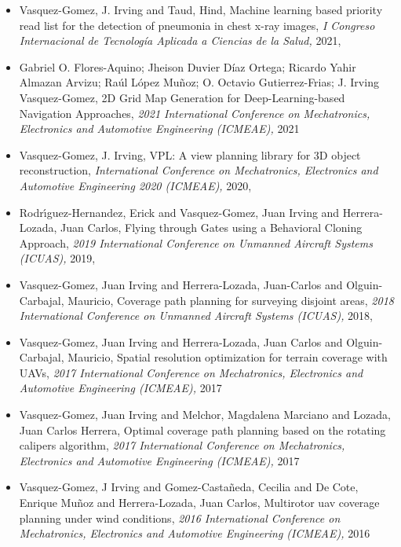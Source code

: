 \begin{itemize} 
\item Vasquez-Gomez, J. Irving and Taud, Hind, Machine learning based priority read list for the detection of pneumonia in chest x-ray images, \textit{ I Congreso Internacional de Tecnología Aplicada a Ciencias de la Salud,} 2021, \href{} {\faFilePdfO} 
\item Gabriel O. Flores-Aquino; Jheison Duvier Díaz Ortega; Ricardo Yahir Almazan Arvizu; Raúl López Muñoz; O. Octavio Gutierrez-Frias; J. Irving Vasquez-Gomez, 2D Grid Map Generation for Deep-Learning-based Navigation Approaches, \textit{ 2021 International Conference on Mechatronics, Electronics and Automotive Engineering (ICMEAE),} 2021 
\item Vasquez-Gomez, J. Irving, VPL: A view planning library for 3D object reconstruction, \textit{ International Conference on Mechatronics, Electronics and Automotive Engineering 2020 (ICMEAE),} 2020, \href{https://doi.org/10.1109/ICMEAE51770.2020.00010} {\faFilePdfO} 
\item Rodr{\'\i}guez-Hernandez, Erick and Vasquez-Gomez, Juan Irving and Herrera-Lozada, Juan Carlos, Flying through Gates using a Behavioral Cloning Approach, \textit{ 2019 International Conference on Unmanned Aircraft Systems (ICUAS),} 2019, \href{https://doi.org/10.1109/ICUAS.2019.8798172} {\faFilePdfO} 
\item Vasquez-Gomez, Juan Irving and Herrera-Lozada, Juan-Carlos and Olguin-Carbajal, Mauricio, Coverage path planning for surveying disjoint areas, \textit{ 2018 International Conference on Unmanned Aircraft Systems (ICUAS),} 2018, \href{https://doi.org/10.1109/ICUAS.2018.8453386} {\faFilePdfO} 
\item Vasquez-Gomez, Juan Irving and Herrera-Lozada, Juan Carlos and Olguin-Carbajal, Mauricio, Spatial resolution optimization for terrain coverage with UAVs, \textit{ 2017 International Conference on Mechatronics, Electronics and Automotive Engineering (ICMEAE),} 2017 
\item Vasquez-Gomez, Juan Irving and Melchor, Magdalena Marciano and Lozada, Juan Carlos Herrera, Optimal coverage path planning based on the rotating calipers algorithm, \textit{ 2017 International Conference on Mechatronics, Electronics and Automotive Engineering (ICMEAE),} 2017 
\item Vasquez-Gomez, J Irving and Gomez-Casta{\~n}eda, Cecilia and De Cote, Enrique Mu{\~n}oz and Herrera-Lozada, Juan Carlos, Multirotor uav coverage planning under wind conditions, \textit{ 2016 International Conference on Mechatronics, Electronics and Automotive Engineering (ICMEAE),} 2016 

\end{itemize}
